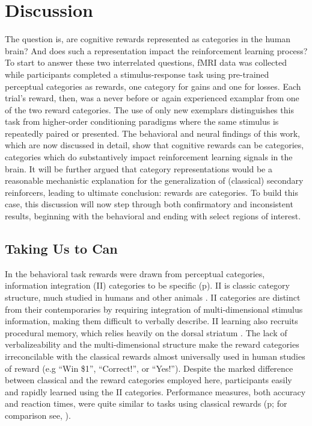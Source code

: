 \section{Discussion}
\label{sec:dicussion}
The question is, are cognitive rewards represented as categories in the human brain?  And does such a representation impact the reinforcement learning process?  To start to answer these two interrelated questions, fMRI data was collected while participants completed a stimulus-response task using pre-trained perceptual categories as rewards, one category for gains and one for losses.  Each trial's reward, then, was a never before or again experienced examplar from one of the two reward categories.  The use of only new exemplars distinguishes this task from higher-order conditioning paradigms where the same stimulus is repeatedly paired or presented.  The behavioral and neural findings of this work, which are now discussed in detail, show that cognitive rewards can be categories, categories which do substantively impact reinforcement learning signals in the brain.  It will be further argued that category representations would be a reasonable mechanistic explanation for the generalization of (classical) secondary reinforcers, leading to ultimate conclusion: rewards are categories.  To build this case, this discussion will now step through both confirmatory and inconsistent results, beginning with the behavioral and ending with select regions of interest.

\subsection{Taking Us to Can}
\label{sub:tocan}
In the behavioral task rewards were drawn from perceptual categories, information integration (II) categories to be specific (p\pageref{subsub:whatwhen}).  II is classic category structure, much studied in humans and other animals \citep{Smith:2011p9101,Ashby:2011p9148,Smith:2010p9713}.  II categories are distinct from their contemporaries by requiring integration of multi-dimensional stimulus information, making them difficult to verbally describe. II learning also recruits procedural memory, which relies heavily on the dorsal striatum \citep{Ashby:1998p9716}.   The lack of verbalizeability and the multi-dimensional structure make the reward categories irreconcilable with the classical rewards almost universally used in human studies of reward (e.g ``Win \$1'', ``Correct!'', or ``Yes!'').  Despite the marked difference between classical and the reward categories employed here, participants easily and rapidly learned using the II categories.  Performance measures, both accuracy and reaction times, were quite similar to tasks using classical rewards (p\pageref{subsub:wellbehaved}; for comparison see, \citet{ODoherty:2003p6329,Ramnani:2000p6515,Aron:2004p1375,Seger:2010p7188,Seger:2005pd}).

